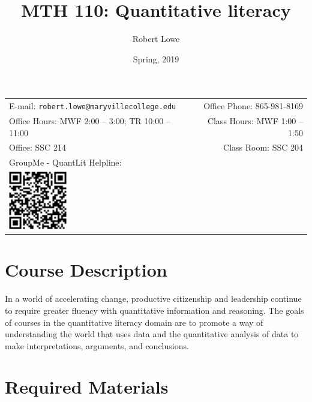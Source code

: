 \documentclass[11pt]{article}
\title{MTH 110: Quantitative literacy}
\author{Robert Lowe}
\date{Spring, 2019}
\newcommand{\blankline}{\quad\pagebreak[2]}
\begin{document}
\maketitle

\blankline

\begin{tabular*}{.93\textwidth}{@{\extracolsep{\fill}}lr}


E-mail: \texttt{robert.lowe@maryvillecollege.edu} & Office Phone: 865-981-8169 \\

 Office Hours: MWF 2:00 -- 3:00; TR 10:00 -- 11:00  &  Class Hours: MWF 1:00 -- 1:50\\

 Office: SSC 214 & Class Room: SSC 204\\
 GroupMe - QuantLit Helpline: & \\
 \includegraphics[width=1in]{ql-helpline} & \\
 
\hline
\end{tabular*}

\vspace{5 mm}


\section*{Course Description}

In a world of accelerating change, productive citizenship and leadership continue to require greater
fluency with quantitative information and reasoning. The goals of courses in the quantitative literacy
domain are to promote a way of understanding the world that uses data and the quantitative analysis of
data to make interpretations, arguments, and conclusions.


\section*{Required Materials}
\end{document}
